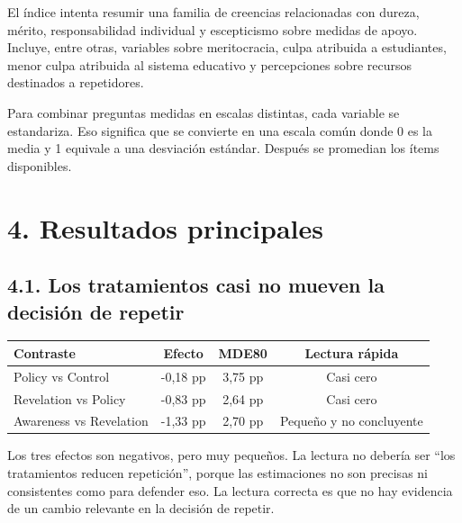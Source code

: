 \documentclass[12pt,a4paper]{article}
\newcommand{\resultrow}[4]{#1 & #2 & #3 & #4\\}
\begin{document}
El índice intenta resumir una familia de creencias relacionadas con dureza, mérito, responsabilidad individual y escepticismo sobre medidas de apoyo. Incluye, entre otras, variables sobre meritocracia, culpa atribuida a estudiantes, menor culpa atribuida al sistema educativo y percepciones sobre recursos destinados a repetidores.

Para combinar preguntas medidas en escalas distintas, cada variable se estandariza. Eso significa que se convierte en una escala común donde 0 es la media y 1 equivale a una desviación estándar. Después se promedian los ítems disponibles.

\vspace{0.3em}
\noindent{}

\section*{4. Resultados principales}

\subsection*{4.1. Los tratamientos casi no mueven la decisión de repetir}

\begin{center}
\begin{tabular}{lccc}
\toprule
Contraste & Efecto & MDE80 & Lectura rápida\\
\midrule
\resultrow{Policy vs Control}{-0,18 pp}{3,75 pp}{Casi cero}
\resultrow{Revelation vs Policy}{-0,83 pp}{2,64 pp}{Casi cero}
\resultrow{Awareness vs Revelation}{-1,33 pp}{2,70 pp}{Pequeño y no concluyente}
\bottomrule
\end{tabular}
\end{center}

Los tres efectos son negativos, pero muy pequeños. La lectura no debería ser ``los tratamientos reducen repetición'', porque las estimaciones no son precisas ni consistentes como para defender eso. La lectura correcta es que no hay evidencia de un cambio relevante en la decisión de repetir.
\end{document}
